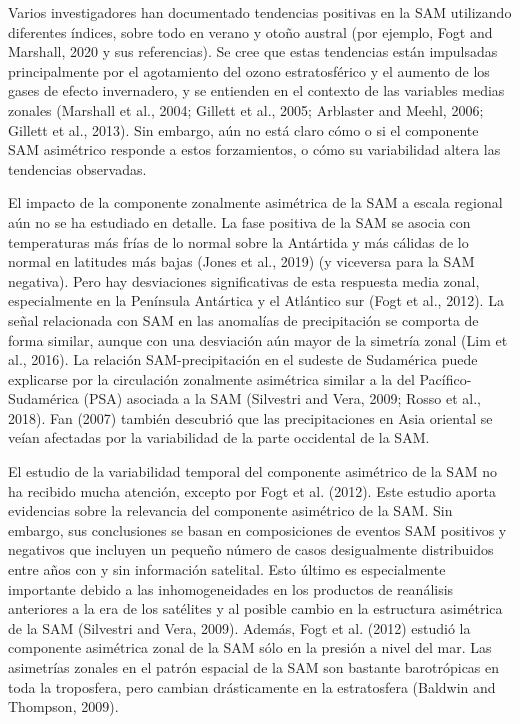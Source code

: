 \documentclass[12pt,oneside]{reedthesis}
\begin{document}
Varios investigadores han documentado tendencias positivas en la SAM utilizando diferentes índices, sobre todo en verano y otoño austral (por ejemplo, Fogt and Marshall, 2020 y sus referencias).
Se cree que estas tendencias están impulsadas principalmente por el agotamiento del ozono estratosférico y el aumento de los gases de efecto invernadero, y se entienden en el contexto de las variables medias zonales (Marshall et al., 2004; Gillett et al., 2005; Arblaster and Meehl, 2006; Gillett et al., 2013).
Sin embargo, aún no está claro cómo o si el componente SAM asimétrico responde a estos forzamientos, o cómo su variabilidad altera las tendencias observadas.

El impacto de la componente zonalmente asimétrica de la SAM a escala regional aún no se ha estudiado en detalle.
La fase positiva de la SAM se asocia con temperaturas más frías de lo normal sobre la Antártida y más cálidas de lo normal en latitudes más bajas (Jones et al., 2019) (y viceversa para la SAM negativa).
Pero hay desviaciones significativas de esta respuesta media zonal, especialmente en la Península Antártica y el Atlántico sur (Fogt et al., 2012).
La señal relacionada con SAM en las anomalías de precipitación se comporta de forma similar, aunque con una desviación aún mayor de la simetría zonal (Lim et al., 2016).
La relación SAM-precipitación en el sudeste de Sudamérica puede explicarse por la circulación zonalmente asimétrica similar a la del Pacífico-Sudamérica (PSA) asociada a la SAM (Silvestri and Vera, 2009; Rosso et al., 2018).
Fan (2007) también descubrió que las precipitaciones en Asia oriental se veían afectadas por la variabilidad de la parte occidental de la SAM.

El estudio de la variabilidad temporal del componente asimétrico de la SAM no ha recibido mucha atención, excepto por Fogt et al. (2012).
Este estudio aporta evidencias sobre la relevancia del componente asimétrico de la SAM.
Sin embargo, sus conclusiones se basan en composiciones de eventos SAM positivos y negativos que incluyen un pequeño número de casos desigualmente distribuidos entre años con y sin información satelital.
Esto último es especialmente importante debido a las inhomogeneidades en los productos de reanálisis anteriores a la era de los satélites y al posible cambio en la estructura asimétrica de la SAM (Silvestri and Vera, 2009).
Además, Fogt et al. (2012) estudió la componente asimétrica zonal de la SAM sólo en la presión a nivel del mar.
Las asimetrías zonales en el patrón espacial de la SAM son bastante barotrópicas en toda la troposfera, pero cambian drásticamente en la estratosfera (Baldwin and Thompson, 2009).
\end{document}
